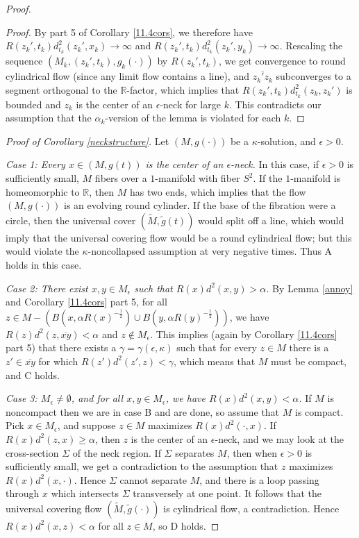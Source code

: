 \documentclass[12pt]{amsart}
\newcommand{\al}{\alpha}
\newcommand{\R}{{\mathbb R}}
\newcommand{\eps}{\epsilon}
\newcommand{\ol}{\overline}
\newcommand{\ra}{\rightarrow}
\newcommand{\Si}{\Sigma}
\numberwithin{equation}{section}
\theoremstyle{plain}
\theoremstyle{definition}
\theoremstyle{remark}
\begin{document}
\begin{proof}
\begin{proof}
By part 5 of Corollary \ref{11.4cors}, we therefore have
$R(z_k',t_k)d_{t_k}^2(z_k',x_k)\ra\infty$ and 
$R(z_k',t_k)d_{t_k}^2(z_k',y_k)\ra\infty$.  Rescaling the sequence
$(M_k,(z_k',t_k),g_k(\cdot))$ by
$R(z_k',t_k)$, we get convergence to round cylindrical flow
(since any limit flow contains a line), and $\ol{z_k'z_k}$
subconverges to a segment orthogonal to the $\R$-factor, which
implies that $R(z_k',t_k)d_{t_k}^2(z_k,z_k')$ is bounded
and $z_k$ is the center of an $\eps$-neck for large $k$.  This contradicts
our assumption that the $\al_k$-version of the lemma is 
violated for each $k$.
\end{proof}

\bigskip
\noindent
{\em Proof of Corollary \ref{neckstructure}.}
Let $(M,g(\cdot))$
be a $\kappa$-solution, and $\eps>0$.

\medskip
{\em Case 1: Every $x\in (M,g(t))$
is the center of an $\eps$-neck.}  In this case, if $\eps>0$ is sufficiently
small, $M$ fibers over a 
$1$-manifold with fiber $S^2$.  If the 
$1$-manifold is homeomorphic to $\R$, then
$M$ has two ends, which implies that the flow
$(M,g(\cdot))$ is an evolving round cylinder.  If the 
base of the fibration were a circle, then the universal
cover $(\tilde M,\tilde g(t))$ would split off
a line, which would imply that the universal covering
flow would be a round cylindrical flow; but this
would violate the $\kappa$-noncollapsed assumption
at very negative times.  Thus A holds in this
case. 


{\em Case 2: There exist $x,y\in M_\eps$ such that
$R(x)d^2(x,y)>\al$.}  By Lemma \ref{annoy} and Corollary \ref{11.4cors}
part 5, for all $z \in M - \left( B(x,\al R(x)^{-\frac{1}{2}})\cup 
B(y,\al R(y)^{-\frac{1}{2}}) \right)
$, we have $R(z)d^2(z,\ol{xy})<\alpha$ and $z \notin M_\epsilon$.
This implies (again by
Corollary \ref{11.4cors} part 5) that there exists a
$\gamma=\gamma(\eps,\kappa)$ such that for every $z\in M$
there is a $z'\in\ol{xy}$ for which  $R(z')d^2(z',z)<\gamma$,
which means that $M$ must be compact, and C holds.

{\em Case 3: $M_\eps\neq \emptyset$, and for all $x,y\in M_\eps$, 
we have $R(x)d^2(x,y)<\al$.}
If $M$ is noncompact then
we are in case B and are done, so assume that $M$ is compact.
Pick $x\in M_\eps$, and suppose  $z\in M$ maximizes
$R(x)d^2(\cdot,x)$.  
If $R(x)d^2(z,x)\geq\al$,  then $z$ is the center of an $\eps$-neck, and we 
may look at the cross-section $\Si$ of the neck region.
If $\Si$ separates $M$, then when $\eps>0$ is sufficiently
small, we  get a contradiction to the assumption
that $z$ maximizes $R(x)d^2(x,\cdot)$.  Hence
$\Si$ cannot separate $M$, and there is a loop
passing through $x$ which intersects $\Si$ transversely
at one point.  It follows that the universal covering flow
$(\tilde M,\tilde g(\cdot))$ is cylindrical flow, a contradiction.
Hence $R(x)d^2(x,z)<\al$ for all $z\in M$, so D holds.
\end{proof}
\end{document}
